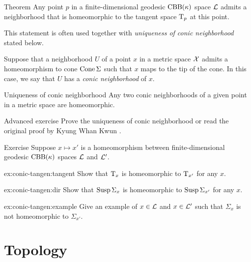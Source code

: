 \begin{thm}{Theorem}\label{thm:spherical-nbhd}
Any point $p$ in a finite-dimensional geodesic $\mathrm{CBB}(\kappa)$ space $\mathcal{L}$
admits a neighborhood that is homeomorphic to the tangent space $\mathrm{T}_p$ at this point.
\end{thm}

This statement is often used together with \textit{uniqueness of conic neighborhood} stated below.

Suppose that a neighborhood $U$ of a point $x$ in a metric space $\mathcal{X}$
admits a homeomorphism to cone $\mathop{\rm Cone}\nolimits\Sigma$ such that $x$ maps to the tip of the cone.
In this case, we say that $U$ has a \emph{conic neighborhood} of $x$.

\begin{thm}{Uniqueness of conic neighborhood}\label{lem:kwun}
Any two conic neighborhoods of a given point in a metric space are homeomorphic.
\end{thm}

\begin{thm}{Advanced exercise}\label{ex:conic}
Prove the uniqueness of conic neighborhood or read the original proof by Kyung Whan Kwun \cite{kwun1964}.
\end{thm}

\begin{thm}{Exercise}\label{ex:conic-tangent}
Suppose $x\mapsto x'$ is a homeomorphism between finite-dimensional geodesic $\mathrm{CBB}(\kappa)$ spaces $\mathcal{L}$ and $\mathcal{L}'$.

\begin{subthm}{ex:conic-tangen:tangent}
Show that $\mathrm{T}_x$ is homeomorphic to $\mathrm{T}_{x'}$ for any $x$.
\end{subthm}

\begin{subthm}{ex:conic-tangen:dir}
Show that $\mathop{\rm Susp}\nolimits\Sigma_x$ is homeomorphic to $\mathop{\rm Susp}\nolimits\Sigma_{x'}$ for any $x$.
\end{subthm}

\begin{subthm}{ex:conic-tangen:example}
Give an example of $x\in\mathcal{L}$ and $x\in\mathcal{L}'$
such that $\Sigma_x$ is not homeomorphic to $\Sigma_{x'}$.
\end{subthm}


\end{thm}



\section{Topology}

